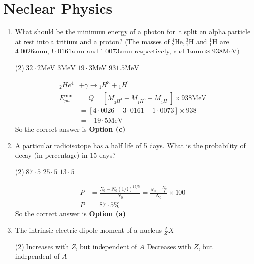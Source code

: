 \chapter{Neclear Physics}
\begin{enumerate}
	\item  What should be the minimum energy of a photon for it split an alpha particle at rest into a tritium and a proton?
	(The masses of ${ }_2^4 \mathrm{He},{ }_1^3 \mathrm{H}$ and ${ }_1^1 \mathrm{H}$ are $4.0026 \mathrm{amu}, 3 \cdot 0161 \mathrm{amu}$ and $1.0073 \mathrm{amu}$ respectively, and $1 \mathrm{amu} \approx 938 \mathrm{MeV})$
	 \begin{tasks}(2)
		\task[\textbf{a.}] $32 \cdot 2 \mathrm{MeV}$
		\task[\textbf{b.}]$3 \mathrm{MeV}$
		\task[\textbf{c.}]$19 \cdot 3 \mathrm{MeV}$
		\task[\textbf{d.}] $931.5 \mathrm{MeV}$
	\end{tasks}
\begin{answer}
	$$
	\begin{aligned}
	{ }_2 H e^4&+\gamma \rightarrow{ }_1 H^3+{ }_1 H^1\\
	E_{p h}^{\min }&=Q=\left[M_{{ }_2 H^4}-M_{{ }_1 H^3}-M_{{ }_1 H^1}\right] \times 938 \mathrm{MeV}\\
	&=[4 \cdot 0026-3 \cdot 0161-1 \cdot 0073] \times 938 \\
	&=-19 \cdot 5 \mathrm{MeV}
\end{aligned}
$$
So the correct answer is \textbf{Option (c)}
\end{answer}
	\item  A particular radioisotope has a half life of 5 days. What is the probability of decay (in percentage) in 15 days?
	 \begin{tasks}(2)
		\task[\textbf{a.}]$87 \cdot 5$
		\task[\textbf{c.}] $25 \cdot 5$
		\task[\textbf{d.}] $13 \cdot 5$
	\end{tasks}
\begin{answer}
	$$
	\begin{aligned}
	P&=\frac{N_0-N_0(1 / 2)^{15 / 5}}{N_0}=\frac{N_0-\frac{N_0}{8}}{N_0} \times 100\\
	P&=87 \cdot 5 \%
\end{aligned}
$$
So the correct answer is \textbf{Option (a)}
\end{answer}
	\item  The intrinsic electric dipole moment of a nucleus ${ }_Z^A X$
	 \begin{tasks}(2)
		\task[\textbf{a.}]Increases with $Z$, but independent of $A$
		\task[\textbf{b.}]Decreases with $Z$, but independent of $A$

\end{tasks}
\end{enumerate}
